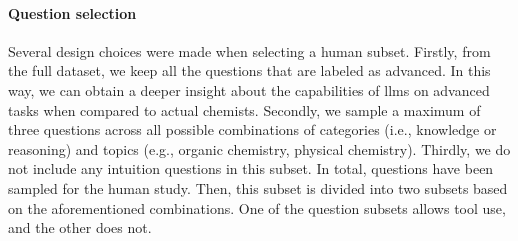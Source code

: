 \paragraph{Question selection}

Several design choices were made when selecting a human subset. Firstly, from the full dataset, we keep all the questions that are labeled as advanced. In this way, we can obtain a deeper insight about the capabilities of \glspl{llm} on advanced tasks
when compared to actual chemists. Secondly, we sample a maximum of three questions across all possible combinations of categories (i.e., knowledge or reasoning) and topics (e.g., organic chemistry, physical chemistry). Thirdly, we do not include any intuition questions
in this subset. In total,  questions have been sampled for the human study. Then, this subset is divided into two subsets based on the aforementioned combinations. One of the question subsets allows tool use, and the other does not.
